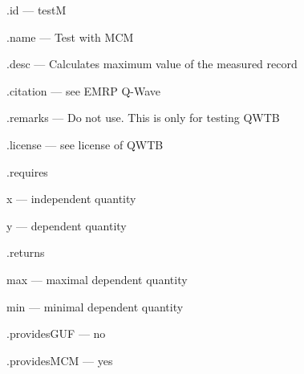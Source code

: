 \begin{tightdesc}
\item [\textsf{.id}] --- testM
\item [\textsf{.name}] --- Test with MCM
\item [\textsf{.desc}] --- Calculates maximum value of the measured record
\item [\textsf{.citation}] --- see EMRP Q-Wave
\item [\textsf{.remarks}] --- Do not use. This is only for testing QWTB
\item [\textsf{.license}] --- see license of QWTB
\item [\textsf{.requires}] \rule{0em}{0em}
\begin{tightdesc}
\item [\textsf{x}] --- independent quantity
\item [\textsf{y}] --- dependent quantity
\end{tightdesc}
\item [\textsf{.returns}] \rule{0em}{0em}
\begin{tightdesc}
\item [\textsf{max}] --- maximal dependent quantity
\item [\textsf{min}] --- minimal dependent quantity
\end{tightdesc}
\item [\textsf{.providesGUF}] --- no
\item [\textsf{.providesMCM}] ---  yes
\end{tightdesc}
